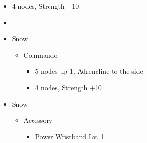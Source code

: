 \begin{paracol}{2}
\begin{menu}
\begin{itemize}
\begin{itemize}
\begin{itemize}
\begin{itemize}
						            \item 4 nodes, Strength +10
					            \end{itemize}
				      \end{itemize}
			\end{itemize}
		\end{itemize}
	\end{menu}
	\switchcolumn
	\begin{menu}
		\begin{itemize}
			\paradigm
			\begin{itemize}
				\item {}%
				      {\paradigmline[1]{\textit{\com}}{\textit{\rav}}{}}%
				      {\paradigmline{\com}{\med}{}}%
				      {\paradigmline{\sen}{\med}{}}%
				      {\paradigmline{\sen}{\syn}{}}%
				      {\paradigmline{[\rav]}{\rav}{}}%
				      {\paradigmline{[\rav]}{\rav}{}}
			\end{itemize}
			\crystarium
			\begin{itemize}
				\item Snow
				      \begin{itemize}
					      \item Commando
					            \begin{itemize}
						            \item 5 nodes up 1, Adrenaline to the side
						            \item 4 nodes, Strength +10
					            \end{itemize}
				      \end{itemize}
			\end{itemize}
			\equip
			\begin{itemize}
				\item Snow
				      \begin{itemize}
					      \item Accessory
					            \begin{itemize}
						            \item Power Wristband Lv. 1
					            \end{itemize}
				      \end{itemize}
			\end{itemize}
		\end{itemize}
	\end{menu}
	\renewcommand{\first}{[1] Slash \& Burn (\com/\rav)}
	\renewcommand{\second}{[2] War \& Peace (\com/\med)}
	\renewcommand{\fifth}{[5] Dualcasting (\rav/\rav)}

\end{paracol}
